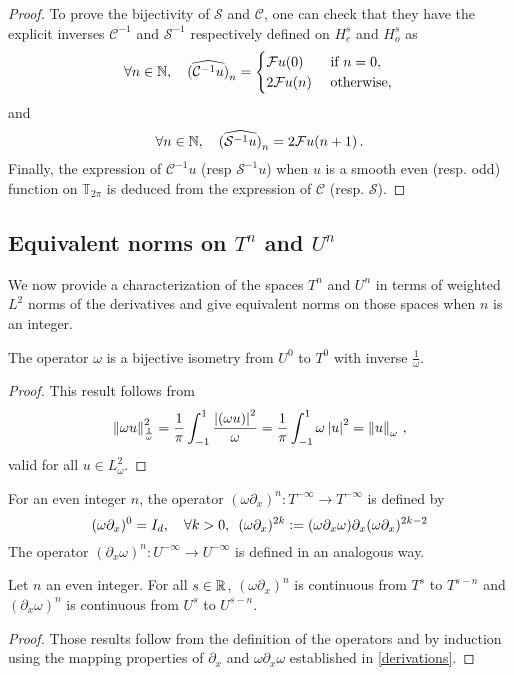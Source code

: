\documentclass[a4paper]{article}
\begin{document}
\begin{proof}
	To prove the bijectivity of $\mathcal{S}$ and $\mathcal{C}$, one can check that they have the  explicit inverses $\mathcal{C}^{-1}$ and $\mathcal{S}^{-1}$ respectively defined on $H^s_e$ and $H^s_o$ as
	\[\forall n \in \mathbb{N}, \quad \widehat{(\mathcal{C}^{-1}u)}_n = \begin{cases}
	\mathcal{F}u(0) & \text{ if } n = 0,\\
	2\mathcal{F}u(n) & \text{ otherwise,}	\end{cases}\,\]
	and
	\[\forall n \in \mathbb{N}, \quad \widehat{(\mathcal{S}^{-1}u)}_n = 2\mathcal{F}u(n+1)\,.\]
	Finally, the expression of $\mathcal{C}^{-1}u$ (resp $\mathcal{S}^{-1}u$) when $u$ is a smooth even (resp. odd) function on $\mathbb{T}_{2\pi}$ is deduced from the expression of $\mathcal{C}$ (resp. $\mathcal{S}$).
\end{proof}
\subsection{Equivalent norms on $T^n$ and $U^n$}
We now provide a characterization of the spaces $T^n$ and $U^n$ in terms of weighted $L^2$ norms of the derivatives and give equivalent norms on those spaces when $n$ is an integer. 
\begin{Lem}
	\label{omegadxetdxomga}
	The operator $\omega$ is a bijective isometry from $U^0$ to $T^0$ with inverse $\frac{1}{\omega}$. 
\end{Lem}
\begin{proof}
	This result follows from
	\[\left\|\omega u\right\|_\frac{1}{\omega}^2 = \frac{1}{\pi}\int_{-1}^1 \frac{\left\lvert (\omega u) \right\rvert^2}{\omega} = \frac{1}{\pi} \int_{-1}^{1} \omega \left\lvert u \right\rvert^2 = \left\|u\right\|_\omega\,,\]
	valid for all $u \in L^2_\omega$.
\end{proof}
\begin{Def}
	For an even integer $n$, the operator $(\omega \partial_x)^n : T^{-\infty} \to T^{-\infty}$ is defined by
	\[(\omega \partial_x)^0 = I_d,\quad \forall k > 0,\,\,\, (\omega \partial_x)^{2k} \mathrel{\mathop:}= (\omega \partial_x \omega) \partial_x (\omega \partial_x)^{2k -2}\] The operator $(\partial_x \omega)^n : U^{-\infty} \to U^{-\infty}$ is defined in an analogous way. 
\end{Def}
\begin{Lem}
	\label{Lemnpair}
	Let $n$ an even integer. For all $s \in \mathbb{R}$, $(\omega \partial_x)^n$ is continuous from $T^s$ to $T^{s - n}$ and $(\partial_x \omega)^n$ is continuous from $U^s$ to $U^{s-n}$. 
\end{Lem}
\begin{proof}
	Those results follow from the definition of the operators and by induction using the mapping properties of $\partial_x$ and $\omega \partial_x \omega$ established in \autoref{derivations}. 
\end{proof}
\end{document}
